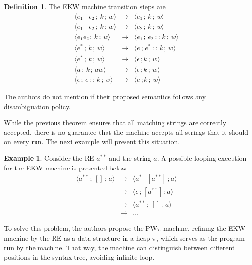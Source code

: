 \documentclass[oneside,12pt]{scrbook}
\theoremstyle{definition}
\newtheorem{Example}{Example}
\theoremstyle{plain}
\theoremstyle{definition}
\newtheorem{Definition}{Definition}
\begin{document}
\begin{Definition}
	The EKW machine transition steps are
	\[
	\begin{array}{rcl}
	\langle e_1 \mid e_2 \,;\, k \,;\, w \rangle & \rightarrow & \langle e_1\, ;\, k\, ;\, w \rangle
	\\
	\langle e_1 \mid e_2 \,;\, k \,;\, w \rangle & \rightarrow & \langle e_2\, ;\, k\, ;\, w \rangle
	\\
	\langle e_1 e_2 \,;\, k \,;\, w \rangle & \rightarrow & \langle e_1\, ;\, e_2\,::\,k\, ;\, w \rangle
	\\
	\langle e^* \,;\, k \,;\, w \rangle & \rightarrow & \langle e\, ;\,e^*\,::\, k\, ;\, w \rangle
	\\
	\langle e^* \,;\, k \,;\, w \rangle & \rightarrow & \langle \epsilon\, ; k\, ;\, w \rangle
	\\
	\langle a \,;\, k \,;\, aw \rangle & \rightarrow & \langle \epsilon\, ; k\, ;\, w \rangle
	\\
	\langle \epsilon \,;\, e\,::\,k \,;\, w \rangle & \rightarrow & \langle e\, ; k\, ;\, w \rangle
	\end{array}
	\]	
\end{Definition}

The authors do not mention if their proposed semantics follows any disambiguation policy.

While the previous theorem ensures that all matching strings are correctly accepted, there is no guarantee that the machine accepts all strings that it should on every run. The next example will present this situation.%

\begin{Example}
	Consider the RE $a^{**}$ and the string $a$. A possible looping execution for the EKW machine is presented below.
	\[
	\begin{array}{ccc}
	\langle a^{**} \,;\,[]\,;\,a\rangle & \rightarrow & \langle a^*\,;\,[a^{**}]\,;a\rangle\\
	& \rightarrow & \langle \epsilon\,;\,[a^{**}]\,;a\rangle\\
	& \rightarrow & \langle a^{**} \,;\,[]\,;\,a\rangle\\
	& \rightarrow & ...
	\end{array}
	\]
\end{Example}


To solve this problem, the authors propose the PW$\pi$ machine, refining the EKW machine by the RE as a data structure in a heap $\pi$, which serves as the program run by the machine. That way, the machine can distinguish between different positions in the syntax tree, avoiding infinite loop.
\end{document}
